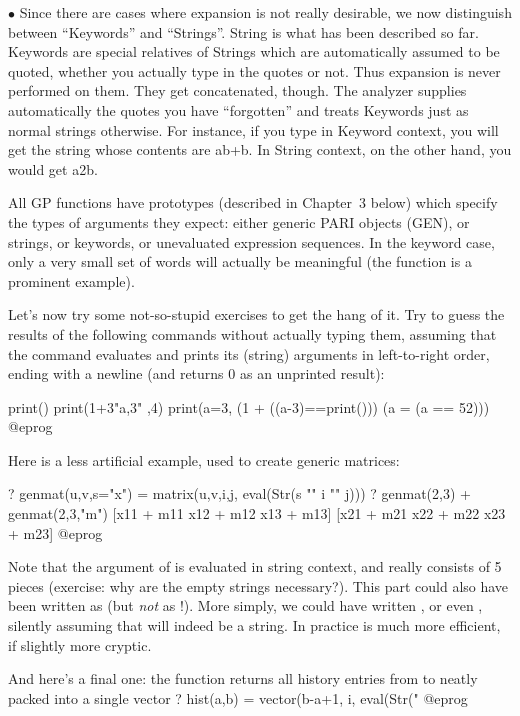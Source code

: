 $\bullet$ Since there are cases where expansion is not really desirable, we
now distinguish between ``Keywords'' and ``Strings''. String is what has been
described so far. Keywords are special relatives of Strings which are
automatically assumed to be quoted, whether you actually type in the quotes
or not. Thus expansion is never performed on them. They get concatenated,
though. The analyzer supplies automatically the quotes you have ``forgotten''
and treats Keywords just as normal strings otherwise. For instance, if you
type  in Keyword context, you will get the string whose contents
are ab+b. In String context, on the other hand, you would get a2\kbd{*}b.

All GP functions have prototypes (described in Chapter~3 below) which
specify the types of arguments they expect: either generic PARI objects
(GEN), or strings, or keywords, or unevaluated expression sequences. In the
keyword case, only a very small set of words will actually be meaningful
(the  function is a prominent example).

Let's now try some not-so-stupid exercises to get the hang of it. Try to
guess the results of the following commands without actually typing them,
assuming that the  command evaluates and prints its (string)
arguments in left-to-right order, ending with a newline (and returns 0
as an unprinted result):

\bprog
  print()
  print(1+3"a,3" ,4)
  print(a=3, (1 + ((a-3)==print())) (a = (a == 5\/2)))
@eprog

\noindent Here is a less artificial example, used to create generic
matrices:

\bprog
? genmat(u,v,s="x") = matrix(u,v,i,j, eval(Str(s "" i "" j)))
? genmat(2,3) + genmat(2,3,"m")
[x11 + m11 x12 + m12 x13 + m13]
[x21 + m21 x22 + m22 x23 + m23]
@eprog

\noindent
Note that the argument of  is evaluated in string context, and
really consists of 5 pieces (exercise: why are the empty strings
necessary?). This part could also have been written as
 (but \emph{not} as !). More simply, we could have written , or even , silently assuming that  will
indeed be a string. In practice  is much more efficient, if
slightly more cryptic.

\noindent And here's a final one: the function  returns all history
entries from  to  neatly packed into a single vector
\bprog
?  hist(a,b) = vector(b-a+1, i, eval(Str("%
@eprog

